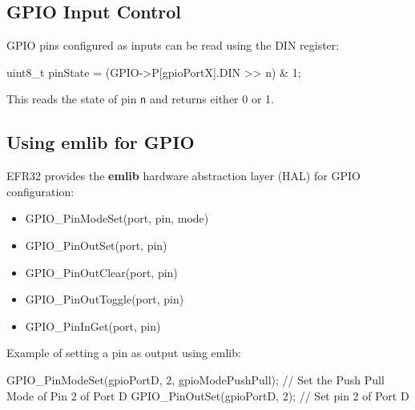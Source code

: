 \documentclass[
  9pt,
  letterpaper,
  abstract,
  titlepage]{scrbook}
\newenvironment{Shaded}{\begin{snugshade}}{\end{snugshade}}
\newcommand{\CommentTok}[1]{\textcolor[rgb]{0.37,0.37,0.37}{#1}}
\newcommand{\DataTypeTok}[1]{\textcolor[rgb]{0.68,0.00,0.00}{#1}}
\newcommand{\DecValTok}[1]{\textcolor[rgb]{0.68,0.00,0.00}{#1}}
\newcommand{\NormalTok}[1]{\textcolor[rgb]{0.00,0.23,0.31}{#1}}
\newcommand{\OperatorTok}[1]{\textcolor[rgb]{0.37,0.37,0.37}{#1}}
\begin{document}
\subsection{GPIO Input Control}\label{gpio-input-control}

GPIO pins configured as inputs can be read using the DIN register:

\begin{Shaded}
\begin{Highlighting}[]
\DataTypeTok{uint8\_t}\NormalTok{ pinState }\OperatorTok{=} \OperatorTok{(}\NormalTok{GPIO}\OperatorTok{{-}\textgreater{}}\NormalTok{P}\OperatorTok{[}\NormalTok{gpioPortX}\OperatorTok{].}\NormalTok{DIN }\OperatorTok{\textgreater{}\textgreater{}}\NormalTok{ n}\OperatorTok{)} \OperatorTok{\&} \DecValTok{1}\OperatorTok{;}
\end{Highlighting}
\end{Shaded}

This reads the state of pin \texttt{n} and returns either 0 or 1.

\subsection{Using emlib for GPIO}\label{using-emlib-for-gpio}

EFR32 provides the \textbf{emlib} hardware abstraction layer (HAL) for
GPIO configuration:

\begin{itemize}
\item
  GPIO\_PinModeSet(port, pin, mode)
\item
  GPIO\_PinOutSet(port, pin)
\item
  GPIO\_PinOutClear(port, pin)
\item
  GPIO\_PinOutToggle(port, pin)
\item
  GPIO\_PinInGet(port, pin)
\end{itemize}

Example of setting a pin as output using emlib:

\begin{Shaded}
\begin{Highlighting}[]
\NormalTok{GPIO\_PinModeSet}\OperatorTok{(}\NormalTok{gpioPortD}\OperatorTok{,} \DecValTok{2}\OperatorTok{,}\NormalTok{ gpioModePushPull}\OperatorTok{);} \CommentTok{// Set the Push Pull Mode of Pin 2 of Port D}
\NormalTok{GPIO\_PinOutSet}\OperatorTok{(}\NormalTok{gpioPortD}\OperatorTok{,} \DecValTok{2}\OperatorTok{);} \CommentTok{// Set pin 2 of Port D}
\end{Highlighting}
\end{Shaded}
\end{document}
